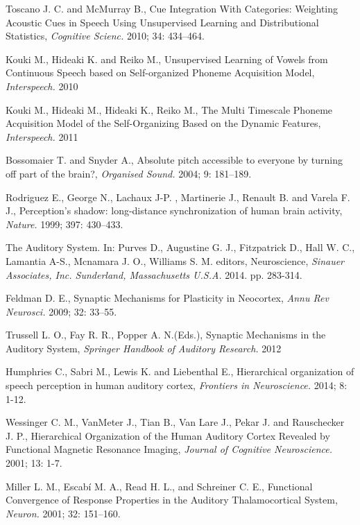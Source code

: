 \documentclass[11pt,a4paper]{article}
\begin{document}
\begin{thebibliography}{9}
  Toscano J. C. and McMurray B.,
  Cue Integration With Categories: Weighting Acoustic Cues in Speech Using Unsupervised Learning and Distributional Statistics,
  \emph{Cognitive Scienc.} 2010; 34: 434–464.

  Kouki M., Hideaki K. and Reiko M.,
  Unsupervised Learning of Vowels from Continuous Speech based on Self-organized Phoneme Acquisition Model,
  \emph{Interspeech.} 2010

  Kouki M., Hideaki M., Hideaki K., Reiko M.,
  The Multi Timescale Phoneme Acquisition Model of the Self-Organizing Based on the Dynamic Features,
  \emph{Interspeech.} 2011

  Bossomaier T. and Snyder A.,
  Absolute pitch accessible to everyone by turning off part of the brain?,
  \emph{Organised Sound.} 2004; 9: 181–189.

  Rodriguez E., George N., Lachaux J-P. , Martinerie J., Renault B. and Varela F. J.,
  Perception's shadow: long-distance synchronization of human brain activity,
  \emph{Nature.} 1999; 397: 430–433.

  The Auditory System. In: Purves D., Augustine G. J., Fitzpatrick D., Hall W. C., Lamantia A-S., Mcnamara J. O., Williams S. M. editors,
  Neuroscience,
  \emph{Sinauer Associates, Inc. Sunderland, Massachusetts U.S.A.} 2014. pp. 283-314.

  Feldman D. E.,
  Synaptic Mechanisms for Plasticity in Neocortex,
  \emph{Annu Rev Neurosci.} 2009; 32: 33–55.

  Trussell L. O., Fay R. R., Popper A. N.(Eds.),
  Synaptic Mechanisms in the Auditory System,
  \emph{Springer Handbook of Auditory Research.} 2012

  Humphries C., Sabri M., Lewis K. and Liebenthal E.,
  Hierarchical organization of speech perception in human auditory cortex,
  \emph{Frontiers in Neuroscience.} 2014; 8: 1-12.

  Wessinger C. M., VanMeter J., Tian B., Van Lare J., Pekar J. and Rauschecker J. P.,
  Hierarchical Organization of the Human Auditory Cortex Revealed by Functional Magnetic Resonance Imaging,
  \emph{Journal of Cognitive Neuroscience.} 2001; 13: 1-7.

  Miller L. M., Escabí M. A., Read H. L., and Schreiner C. E.,
  Functional Convergence of Response Properties in the Auditory Thalamocortical System,
  \emph{Neuron.} 2001; 32: 151–160.


\end{thebibliography}
\end{document}
